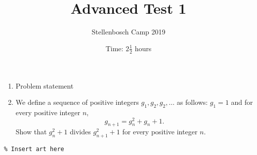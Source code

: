 \documentclass{article}
\title{Advanced Test 1}
\author{Stellenbosch Camp 2019}
\date{Time: $2\frac{1}{2}$ hours}
\begin{document}
\maketitle
\thispagestyle{empty}


\begin{enumerate}[1.]

\item %
Problem statement

\item %
We define a sequence of positive integers $g_1, g_2, g_2, \dotsc$ as follows: $g_1 = 1$ and for every positive integer $n$,
\[ g_{n+1} = g_n^2 +g_n +1. \]
Show that $g_n^2+1$ divides $g_{n+1}^2+1$ for every positive integer $n$.

\end{enumerate}


\vfill
\begin{center} \begin{verbatim}
% Insert art here
\end{verbatim} \end{center}
\end{document}
